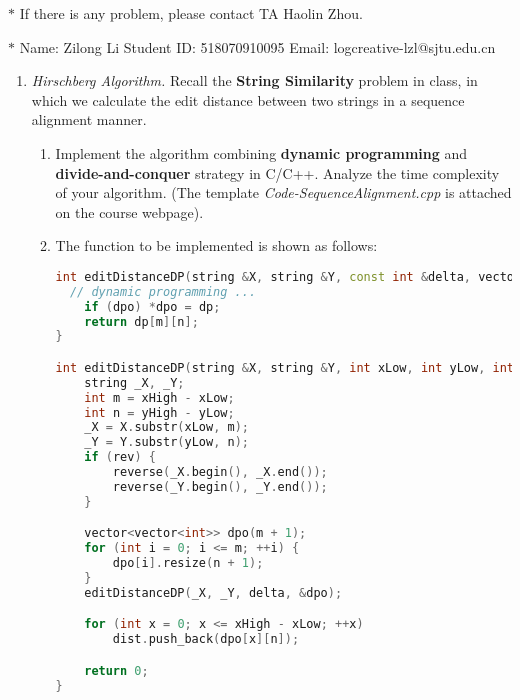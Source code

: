\documentclass[12pt,a4paper]{article}
\makeatletter
\newtheorem*{solution}{Solution}
\theoremstyle{definition}
\renewenvironment{solution}[1][Solution] {\par\pushQED{\qed}\normalfont\topsep6\p@\@plus6\p@\relax\trivlist\item[\hskip\labelsep\bfseries#1\@addpunct{.}]\ignorespaces}{\popQED\endtrivlist\@endpefalse} \makeatother
\makeatother
\begin{document}
\noindent

\noindent{}
\begin{center}
\footnotesize{\color{red}$*$ If there is any problem, please contact TA Haolin Zhou.}

\footnotesize{\color{blue}$*$ Name: Zilong Li  \quad Student ID: 518070910095 \quad Email: logcreative-lzl@sjtu.edu.cn}
\end{center}

\begin{enumerate}
    \item
    \textit{Hirschberg Algorithm.} Recall the \textbf{String Similarity} problem in class, in which we calculate the edit distance between two strings in a sequence alignment manner.
    \begin{enumerate}
    	\item
    	Implement the algorithm combining \textbf{dynamic programming} and \textbf{divide-and-conquer} strategy in C/C++. Analyze the time complexity of your algorithm. {\color{blue}(The template \emph{Code-SequenceAlignment.cpp} is attached on the course webpage)}.
    	
      \begin{solution}
      The function to be implemented is shown as follows:
      \begin{lstlisting}[language=c++]
int editDistanceDP(string &X, string &Y, const int &delta, vector<vector<int>> *dpo = NULL) {
  // dynamic programming ...
	if (dpo) *dpo = dp;
	return dp[m][n];
}

int editDistanceDP(string &X, string &Y, int xLow, int yLow, int xHigh, int yHigh, const int &delta, bool rev, vector<int> &dist) {
	string _X, _Y;
	int m = xHigh - xLow;
	int n = yHigh - yLow;
	_X = X.substr(xLow, m);
	_Y = Y.substr(yLow, n);
	if (rev) {
		reverse(_X.begin(), _X.end());
		reverse(_Y.begin(), _Y.end());
	}

	vector<vector<int>> dpo(m + 1);
	for (int i = 0; i <= m; ++i) {
		dpo[i].resize(n + 1);
	}
	editDistanceDP(_X, _Y, delta, &dpo);

	for (int x = 0; x <= xHigh - xLow; ++x) 
		dist.push_back(dpo[x][n]);

	return 0;
}
      \end{lstlisting}


\end{solution}
\end{enumerate}
\end{enumerate}
\end{document}
